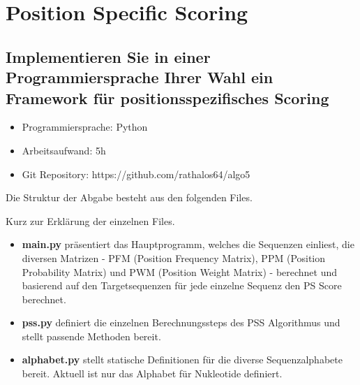 \section{Position Specific Scoring}
\subsection*{Implementieren Sie in einer Programmiersprache Ihrer Wahl ein Framework für positionsspezifisches Scoring}

\noindent
\begin{itemize}
	\item Programmiersprache: Python
	\item Arbeitsaufwand: 5h
	\item Git Repository: https://github.com/rathalos64/algo5
\end{itemize}

\bigskip\noindent
Die Struktur der Abgabe besteht aus den folgenden Files.
\newline
{}

\bigskip
Kurz zur Erklärung der einzelnen Files.
\begin{itemize}
	\item \textbf{main.py} präsentiert das Hauptprogramm, welches die Sequenzen einliest, die diversen Matrizen -
	PFM (Position Frequency Matrix), PPM (Position Probability Matrix) und PWM (Position Weight Matrix) - berechnet und
	basierend auf den Targetsequenzen für jede einzelne Sequenz den PS Score berechnet.
	\item \textbf{pss.py} definiert die einzelnen Berechnungssteps des PSS Algorithmus und stellt passende Methoden bereit.
	\item \textbf{alphabet.py} stellt statische Definitionen für die diverse Sequenzalphabete bereit. Aktuell ist nur das 
	Alphabet für Nukleotide definiert.
\end{itemize}


% 

